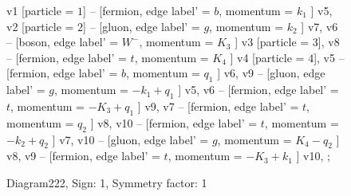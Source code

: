 \documentclass{revtex4}
\begin{document}
\begin{figure}[!htb]
\begin{center}
{    %
v1 [particle = \(1\)] -- [fermion, edge label' = \(b\), momentum = \(k_{1}\) ] v5, 
v2 [particle = \(2\)] -- [gluon, edge label' = \(g\), momentum = \(k_{2}\) ] v7, 
v6 -- [boson, edge label' = \(W^{-}\), momentum = \(K_{3}\) ] v3 [particle = \(3\)], 
v8 -- [fermion, edge label' = \(t\), momentum = \(K_{4}\) ] v4 [particle = \(4\)], 
v5 -- [fermion, edge label' = \(b\), momentum = \(q_{1}\) ] v6, 
v9 -- [gluon, edge label' = \(g\), momentum = \(-k_{1} + q_{1}\) ] v5, 
v6 -- [fermion, edge label' = \(t\), momentum = \(-K_{3} + q_{1}\) ] v9, 
v7 -- [fermion, edge label' = \(t\), momentum = \(q_{2}\) ] v8, 
v10 -- [fermion, edge label' = \(t\), momentum = \(-k_{2} + q_{2}\) ] v7, 
v10 -- [gluon, edge label' = \(g\), momentum = \(K_{4} - q_{2}\) ] v8, 
v9 -- [fermion, edge label' = \(t\), momentum = \(-K_{3} + k_{1}\) ] v10, 
};
\end{center}
\caption{Diagram222, Sign: 1, Symmetry factor: 1}
\end{figure}
\newpage
\end{document}
